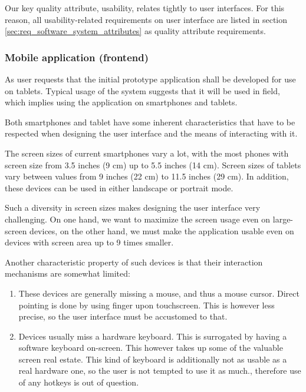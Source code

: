 \documentclass[11pt]{book}
\begin{document}
Our key quality attribute, usability, relates tightly to user interfaces. For this reason, all usability-related requirements on user interface are listed in section \ref{sec:req_software_system_attributes} as quality attribute requirements.

\subsubsection{Mobile application (frontend)}\label{sec:req_webapplication_frontend}
As user requests that the initial prototype application shall be developed for use on tablets. Typical usage of the system suggests that it will be used in field, which implies using the application on smartphones and tablets.

Both smartphones and tablet have some inherent characteristics that have to be respected when designing the user interface and the means of interacting with it.

The screen sizes of current smartphones vary a lot, with the most phones with screen size from 3.5 inches (9 cm) up to 5.5 inches (14 cm). Screen sizes of tablets vary between values from 9 inches (22 cm) to 11.5 inches (29 cm). In addition, these devices can be used in either landscape or portrait mode.

Such a diversity in screen sizes makes designing the user interface very challenging. On one hand, we want to maximize the screen usage even on large-screen devices, on the other hand, we must make the application usable even on devices with screen area up to 9 times smaller.

Another characteristic property of such devices is that their interaction mechanisms are somewhat limited:

\begin{enumerate}
  \item These devices are generally missing a mouse, and thus a mouse cursor. Direct pointing is done by using finger upon touchscreen. This is however less precise, so the user interface must be accustomed to that.
  \item Devices usually miss a hardware keyboard. This is surrogated by having a software keyboard on-screen. This however takes up some of the valuable screen real estate. This kind of keyboard is additionally not as usable as a real hardware one, so the user is not tempted to use it as much., therefore use of any hotkeys is out of question.
\end{enumerate}
\end{document}
